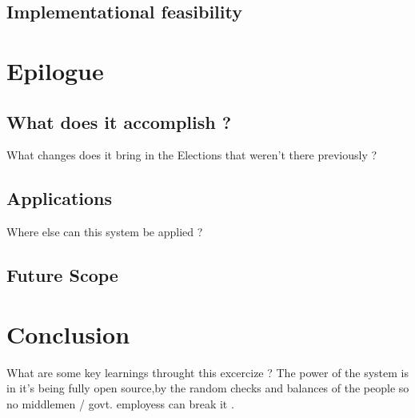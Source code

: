 \documentclass[12pt]{report}
\begin{document}
\section{Implementational feasibility}


\chapter{Epilogue}
\section{What does it accomplish ?}
What changes does it bring in the Elections that weren't there previously ?
\section{Applications}
Where else can this system be applied ?
\section{Future Scope}


\chapter{Conclusion}
What are some key learnings throught this excercize ? The power of the system is in it's being fully open source,by the random checks and balances of the people so no middlemen / govt. employess can break it .

\end{document}
